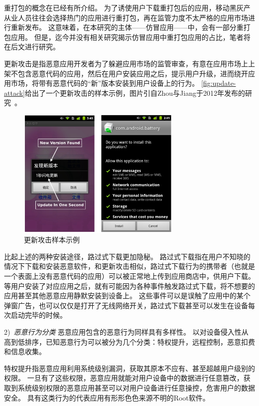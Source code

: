 重打包的概念在已经有所介绍。
为了诱使用户下载重打包后的应用，移动黑灰产从业人员往往会选择热门的应用进行重打包，再在监管力度不太严格的应用市场进行重新发布。
这意味着，在本研究的主体——仿冒应用——中，会有一部分重打包应用。
但是，迄今并没有相关研究揭示仿冒应用中重打包应用的占比，笔者将在后文进行研究。

更新攻击是指恶意应用开发者为了躲避应用市场的监管审查，有意在应用市场上上架不包含恶意代码的应用，然后在用户安装应用之后，提示用户升级，进而绕开应用市场，将带有恶意代码的``新''版本安装到用户设备上的行为。
\autoref{fig:update-attack}给出了一个更新攻击的样本示例，图片引自Zhou与Jiang于2012年发布的研究~\cite{Zhou2012DissectingAM}。

\begin{figure}[h]
	\centering
	\includegraphics[width=0.7\textwidth]{./Figures/edwin-update-attack}
	\caption{更新攻击样本示例}
	\label{fig:update-attack}
	\vspace{-5mm}
\end{figure}

比起上述的两种安装途径，路过式下载更加隐秘。
路过式下载指在用户不知晓的情况下下载和安装恶意软件，和更新攻击相似，路过式下载行为的携带者（也就是一个表面上没有恶意代码的应用）可以被正常地上传到应用商店中，供用户下载。
等用户安装了对应应用之后，就有可能因为各种事件触发路过式下载，将不想要的应用甚至其他恶意应用静默安装到设备上。
这些事件可以是误触了应用中的某个弹窗广告，也可以仅仅是打开了无线网络开关，路过式下载甚至可以发生在设备每次启动完毕的时候。

2)\ \emph{恶意行为分类} \quad
恶意应用包含的恶意行为同样具有多样性。
以对设备侵入性从高到低排序，已知恶意行为可以被分为几个分类：特权提升，远程控制，恶意扣费和信息收集。

特权提升指恶意应用利用系统级别漏洞，获取其原本不应有、甚至超越用户级别的权限。
一旦有了这些权限，恶意应用就能对用户设备中的数据进行任意篡改，获取到系统级别权限的恶意应用甚至可以对用户设备进行任意操控，危害用户的数据安全。
具有这类行为的代表应用有形形色色来源不明的Root软件。

